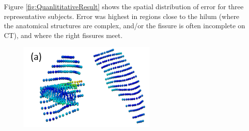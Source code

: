 \documentclass[]{spie}  %
\begin{document}
{Figure \ref{fig:QuanlititativeResult} shows the spatial distribution of error for three representative subjects. Error was highest in regions close to the hilum (where the anatomical structures are complex, and/or the fissure is often incomplete on CT), and where the right fissures meet. 

\begin{figure}[htbp] 
\centering
\begin{subfigure}{
  \begin{minipage}[t]{0.23\linewidth}
  \includegraphics[width=\linewidth,trim={{.0\wd0} {.0\wd0} {.0\wd0} {.0\wd0}},clip]{Image/QuanlititativeResult1.png} %
  \centerline{}
	\end{minipage}%
   }%
  \label{fig:QuanlititativeResult-a} 
\end{subfigure} 
\begin{subfigure}{
  \begin{minipage}[t]{0.21\linewidth}

\end{minipage}}
\end{subfigure}
\end{figure}}
\end{document}
